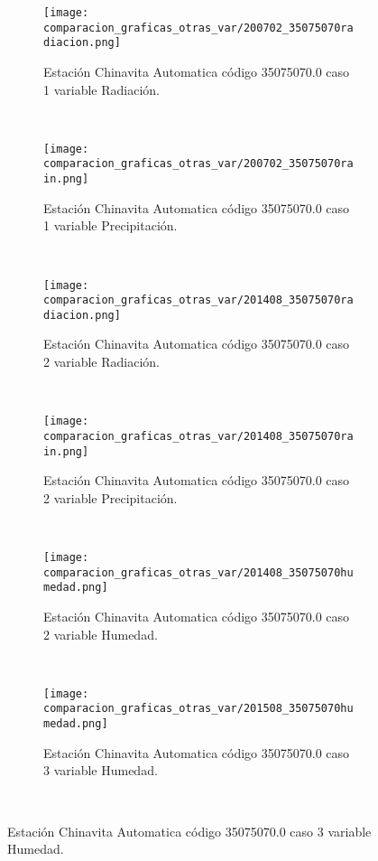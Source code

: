 \begin{figure}[H]
\centering
\begin{subfigure}[normla]{0.4\textwidth}
\caption{Estación Chinavita Automatica código 35075070.0 caso 1 variable Radiación.}
\texttt{[image: comparacion\_graficas\_otras\_var/200702\_35075070radiacion.png]}
\end{subfigure}
~
\begin{subfigure}[normla]{0.4\textwidth}
\caption{Estación Chinavita Automatica código 35075070.0 caso 1 variable Precipitación.}
\texttt{[image: comparacion\_graficas\_otras\_var/200702\_35075070rain.png]}
\end{subfigure}
~
\begin{subfigure}[normla]{0.4\textwidth}
\caption{Estación Chinavita Automatica código 35075070.0 caso 2 variable Radiación.}
\texttt{[image: comparacion\_graficas\_otras\_var/201408\_35075070radiacion.png]}
\end{subfigure}
~
\begin{subfigure}[normla]{0.4\textwidth}
\caption{Estación Chinavita Automatica código 35075070.0 caso 2 variable Precipitación.}
\texttt{[image: comparacion\_graficas\_otras\_var/201408\_35075070rain.png]}
\end{subfigure}
~
\begin{subfigure}[normla]{0.4\textwidth}
\caption{Estación Chinavita Automatica código 35075070.0 caso 2 variable Humedad.}
\texttt{[image: comparacion\_graficas\_otras\_var/201408\_35075070humedad.png]}
\end{subfigure}
~
\begin{subfigure}[normla]{0.4\textwidth}
\caption{Estación Chinavita Automatica código 35075070.0 caso 3 variable Humedad.}
\texttt{[image: comparacion\_graficas\_otras\_var/201508\_35075070humedad.png]}
\end{subfigure}
~
\end{figure}
           
